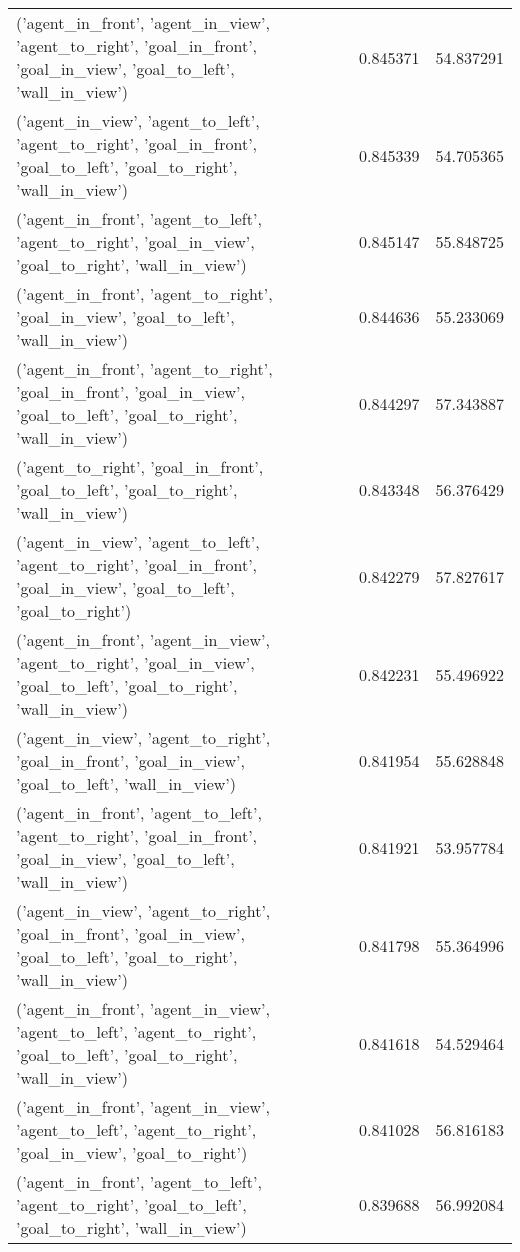 \begin{tabular}{lrr}
('agent\_in\_front', 'agent\_in\_view', 'agent\_to\_right', 'goal\_in\_front', 'goal\_in\_view', 'goal\_to\_left', 'wall\_in\_view') & 0.845371 & 54.837291 \\
('agent\_in\_view', 'agent\_to\_left', 'agent\_to\_right', 'goal\_in\_front', 'goal\_to\_left', 'goal\_to\_right', 'wall\_in\_view') & 0.845339 & 54.705365 \\
('agent\_in\_front', 'agent\_to\_left', 'agent\_to\_right', 'goal\_in\_view', 'goal\_to\_right', 'wall\_in\_view') & 0.845147 & 55.848725 \\
('agent\_in\_front', 'agent\_to\_right', 'goal\_in\_view', 'goal\_to\_left', 'wall\_in\_view') & 0.844636 & 55.233069 \\
('agent\_in\_front', 'agent\_to\_right', 'goal\_in\_front', 'goal\_in\_view', 'goal\_to\_left', 'goal\_to\_right', 'wall\_in\_view') & 0.844297 & 57.343887 \\
('agent\_to\_right', 'goal\_in\_front', 'goal\_to\_left', 'goal\_to\_right', 'wall\_in\_view') & 0.843348 & 56.376429 \\
('agent\_in\_view', 'agent\_to\_left', 'agent\_to\_right', 'goal\_in\_front', 'goal\_in\_view', 'goal\_to\_left', 'goal\_to\_right') & 0.842279 & 57.827617 \\
('agent\_in\_front', 'agent\_in\_view', 'agent\_to\_right', 'goal\_in\_view', 'goal\_to\_left', 'goal\_to\_right', 'wall\_in\_view') & 0.842231 & 55.496922 \\
('agent\_in\_view', 'agent\_to\_right', 'goal\_in\_front', 'goal\_in\_view', 'goal\_to\_left', 'wall\_in\_view') & 0.841954 & 55.628848 \\
('agent\_in\_front', 'agent\_to\_left', 'agent\_to\_right', 'goal\_in\_front', 'goal\_in\_view', 'goal\_to\_left', 'wall\_in\_view') & 0.841921 & 53.957784 \\
('agent\_in\_view', 'agent\_to\_right', 'goal\_in\_front', 'goal\_in\_view', 'goal\_to\_left', 'goal\_to\_right', 'wall\_in\_view') & 0.841798 & 55.364996 \\
('agent\_in\_front', 'agent\_in\_view', 'agent\_to\_left', 'agent\_to\_right', 'goal\_to\_left', 'goal\_to\_right', 'wall\_in\_view') & 0.841618 & 54.529464 \\
('agent\_in\_front', 'agent\_in\_view', 'agent\_to\_left', 'agent\_to\_right', 'goal\_in\_view', 'goal\_to\_right') & 0.841028 & 56.816183 \\
('agent\_in\_front', 'agent\_to\_left', 'agent\_to\_right', 'goal\_to\_left', 'goal\_to\_right', 'wall\_in\_view') & 0.839688 & 56.992084 \\

\end{tabular}
